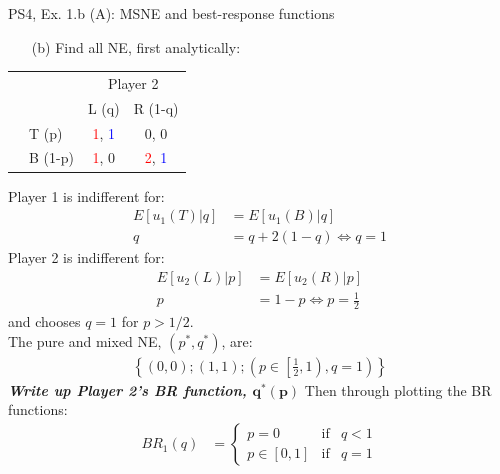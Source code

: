 \begin{frame}{PS4, Ex. 1.b (A): MSNE and best-response functions}
  \begin{multicols}{2}
    \begin{itemize}
      \item[(b)] Find all NE, first analytically:
    \end{itemize}
    \begin{table}
      \begin{tabular}{cl|c|c|}
        & \multicolumn{1}{c}{} & \multicolumn{2}{c}{\color{blue}Player 2}\\
        \parbox[t]{1mm}{}
        &  &  &  \\
        & T (p) & \textcolor{red}{1}, \textcolor{blue}{1} & 0, 0 \\
        & B (1-p) & \textcolor{red}{1}, 0 & \textcolor{red}{2}, \textcolor{blue}{1} \\
      \end{tabular}
    \end{table}
    Player 1 is indifferent for:
    \begin{align*}
      E[u_1(T)|q]&=E[u_1(B)|q]\\
      q &= q + 2(1-q) \Leftrightarrow q = 1
    \end{align*}
    Player 2 is indifferent for:
    \begin{align*}
      E[u_2(L)|p]&=E[u_2(R)|p]\\
      p &= 1-p \Leftrightarrow p = \frac{1}{2}
    \end{align*}
    and chooses $q=1$ for $p>1/2$.\\\medskip
    The pure and mixed NE, $(p^{*},q^{*})$, are:
    \begin{align*}
      \left\{(0,0);(1,1);\left(p\in\left[\frac{1}{2},1\right),q=1\right)\right\}
    \end{align*}
    \textbf{\textit{Write up Player 2's BR function, $\bm{q^{*}(p)}$}}
  \vfill\null \columnbreak
    Then through plotting the BR functions:
    \vspace{-8pt}
    \begin{align*}
      BR_1(q)&=\left\{ \begin{array}{lcl}
          p=0       & \text{if} & q<1 \\
          p\in[0,1] & \text{if} & q=1
      \end{array}\right.\\

\end{align*}
\end{multicols}
\end{frame}
